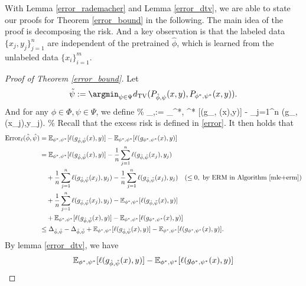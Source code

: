 With Lemma \ref{error_rademacher} and Lemma \ref{error_dtv}, we are able to state our proofs for Theorem \ref{error_bound} in the following. The main idea of the proof is decomposing the risk. And a key observation is that the labeled data $\{x_j,y_j\}^{n}_{j=1}$ are independent of the pretrained $\hat\phi$, which is learned from the unlabeled data $\{x_i\}^m_{i=1}$.
\begin{proof}[Proof of Theorem  \ref{error_bound}] 
Let 
\begin{align}
\tilde{\psi} := \argmin_{\psi \in \Psi} d_\mathrm{TV} (P_{\hat{\phi},\psi}(x,y),P_{\phi^{*},\psi^{*}}(x,y)).
\end{align}
And for any $\phi \in \Phi, \psi \in \Psi$, we define
\%
\Delta_{\phi,\psi}:= _{\phi^{*}, \psi^{*}} [\ell (g_{\phi, \psi}(x),y)] - \sum_{j=1}^{n} \ell (g_{\phi, \psi}(x_{j}),y_{j}).
\%
Recall that the excess risk is defined in \eqref{error}. It then holds that
\begin{align}\label{092705}
\operatorname{Error}_{\ell}(\hat{\phi}, \hat{\psi}) &= \mathbb{E}_{\phi^{*}, \psi^{*}} [\ell (g_{\hat{\phi}, \hat{\psi}}(x),y)] - \mathbb{E}_{\phi^{*},\psi^{*}} [\ell (g_{\phi^{*},\psi^{*}}(x),y)] \notag \\
&= \mathbb{E}_{\phi^{*}, \psi^{*}} [\ell (g_{\hat{\phi}, \hat{\psi}}(x),y)] - \frac{1}{n}\sum_{j=1}^{n} \ell (g_{\hat{\phi}, \hat{\psi}}(x_{j}),y_{j}) \notag \\
&\quad+ \frac{1}{n}\sum_{j=1}^{n} \ell (g_{\hat{\phi}, \hat{\psi}}(x_{j}),y_{j}) - \frac{1}{n}\sum_{j=1}^{n} \ell (g_{\hat{\phi}, \tilde{\psi}}(x_{j}),y_{j}) \quad (\leq 0, \text{ by ERM in Algorithm \ref{mle+erm}}) \notag \\
&\quad+ \frac{1}{n}\sum_{j=1}^{n} \ell (g_{\hat{\phi}, \tilde{\psi}}(x_{j}),y_{j}) - \mathbb{E}_{\phi^{*}, \psi^{*}} [\ell (g_{\hat{\phi}, \tilde{\psi}}(x),y)] \notag \\
&\quad+ \mathbb{E}_{\phi^{*}, \psi^{*}} [\ell (g_{\hat{\phi}, \tilde{\psi}}(x),y)] - \mathbb{E}_{\phi^{*},\psi^{*}} [\ell (g_{\phi^{*},\psi^{*}}(x),y)] \notag \\
& \leq\Delta_{\hat{\phi}, \hat{\psi}} - \Delta_{\hat{\phi}, \tilde{\psi}} + \mathbb{E}_{\phi^{*}, \psi^{*}} [\ell (g_{\hat{\phi}, \tilde{\psi}}(x),y)] - \mathbb{E}_{\phi^{*},\psi^{*}} [\ell (g_{\phi^{*},\psi^{*}}(x),y)].
\end{align}
By lemma \ref{error_dtv}, we have
\begin{align}\label{092706}
&\mathbb{E}_{\phi^{*}, \psi^{*}} [\ell (g_{\hat{\phi}, \tilde{\psi}}(x),y)] - \mathbb{E}_{\phi^{*},\psi^{*}} [\ell (g_{\phi^{*},\psi^{*}}(x),y)] \notag \\

\end{align}
\end{proof}

